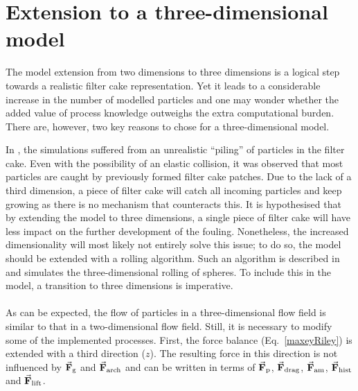 
\section{Extension to a three-dimensional model \label{sec:3D}}
The model extension from two dimensions to three dimensions is a logical step towards a realistic filter cake representation. Yet it %
leads to a considerable increase in the number of modelled particles and one may wonder whether the added value of  process knowledge %
outweighs the extra computational burden. There are, however, two key reasons to chose for a three-dimensional model. \par
In \cite{Ghijs2014}, the simulations suffered from an unrealistic ``piling'' of particles in the filter cake. %
Even with the possibility of an elastic collision, it was observed that most particles are caught by previously formed filter cake patches. Due to the lack of a third dimension, a piece of filter cake will catch all incoming particles and keep growing as there is no mechanism that counteracts this. %
It is hypothesised that by extending the model to three dimensions, a single piece of filter cake will have less impact on the further development of the fouling. Nonetheless, the increased dimensionality will most likely not entirely solve this issue; to do so, the model should be extended with a rolling algorithm. Such an algorithm is described in \cite{Smets} and simulates the three-dimensional rolling of spheres. To include this in the model, a transition to three dimensions is imperative. \\ \\
As can be expected, the flow of particles in a three-dimensional flow field is similar to that in a two-dimensional flow field. Still, it is necessary to modify some of the implemented processes. First, the force balance  (Eq.\ \eqref{maxeyRiley}) is extended with a third direction ($z$). The resulting force in this direction is not influenced by $\vec{\mathbf{F}}_\mathrm{g}$ and $\vec{\mathbf{F}}_\mathrm{arch}$ and can be written in terms of $\vec{\mathbf{F}}_\mathrm{p}$, $\vec{\mathbf{F}}_\mathrm{drag}$, $\vec{\mathbf{F}}_\mathrm{am}$, $\vec{\mathbf{F}}_\mathrm{hist}$ and $\vec{\mathbf{F}}_\mathrm{lift}$. \par
